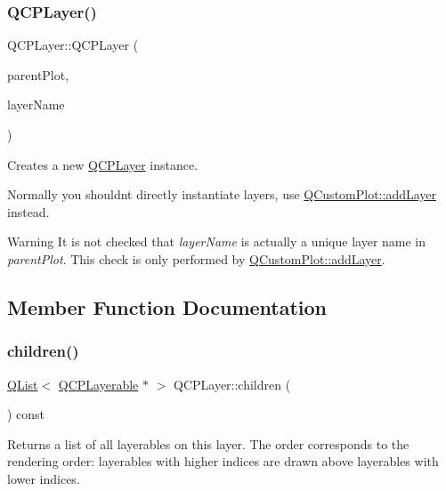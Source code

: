 \subsubsection{\texorpdfstring{Q\+C\+P\+Layer()}{QCPLayer()}}
{\footnotesize\ttfamily Q\+C\+P\+Layer\+::\+Q\+C\+P\+Layer (\begin{DoxyParamCaption}\item[{\hyperlink{class_q_custom_plot}{Q\+Custom\+Plot} $\ast$}]{parent\+Plot,  }\item[{const Q\+String \&}]{layer\+Name }\end{DoxyParamCaption})}

Creates a new \hyperlink{class_q_c_p_layer}{Q\+C\+P\+Layer} instance.

Normally you shouldn\textquotesingle{}t directly instantiate layers, use \hyperlink{class_q_custom_plot_ad5255393df078448bb6ac83fa5db5f52}{Q\+Custom\+Plot\+::add\+Layer} instead.

\begin{DoxyWarning}{Warning}
It is not checked that {\itshape layer\+Name} is actually a unique layer name in {\itshape parent\+Plot}. This check is only performed by \hyperlink{class_q_custom_plot_ad5255393df078448bb6ac83fa5db5f52}{Q\+Custom\+Plot\+::add\+Layer}. 
\end{DoxyWarning}


\subsection{Member Function Documentation}
\mbox{\label{class_q_c_p_layer_a183b90941fc78f0b136edd77c5fb6966}} 
\subsubsection{\texorpdfstring{children()}{children()}}
{\footnotesize\ttfamily \hyperlink{class_q_list}{Q\+List}$<$ \hyperlink{class_q_c_p_layerable}{Q\+C\+P\+Layerable} $\ast$ $>$ Q\+C\+P\+Layer\+::children (\begin{DoxyParamCaption}{ }\end{DoxyParamCaption}) const\hspace{0.3cm}{\ttfamily [inline]}}

Returns a list of all layerables on this layer. The order corresponds to the rendering order\+: layerables with higher indices are drawn above layerables with lower indices. \mbox{\label{class_q_c_p_layer_ad322905c4700dcc7ceba63e011c730d2}} 
